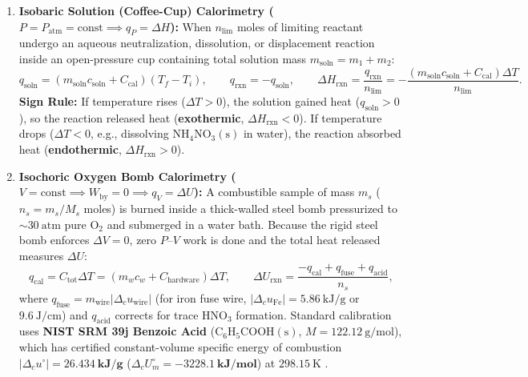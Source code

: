 \begin{enumerate}
  \item \textbf{Isobaric Solution (Coffee-Cup) Calorimetry ($P = P_{\mathrm{atm}} = \text{const} \implies q_P = \Delta H$):}
  When $n_{\mathrm{lim}}$ moles of limiting reactant undergo an aqueous neutralization, dissolution, or displacement reaction inside an open-pressure cup containing total solution mass $m_{\mathrm{soln}} = m_1 + m_2$:
  \begin{equation}\label{eq:04:coffeecup}
    q_{\mathrm{soln}} = (m_{\mathrm{soln}} c_{\mathrm{soln}} + C_{\mathrm{cal}})(T_f - T_i), \qquad
    q_{\mathrm{rxn}} = -q_{\mathrm{soln}}, \qquad
    \Delta H_{\mathrm{rxn}} = \frac{q_{\mathrm{rxn}}}{n_{\mathrm{lim}}} = -\frac{(m_{\mathrm{soln}} c_{\mathrm{soln}} + C_{\mathrm{cal}})\Delta T}{n_{\mathrm{lim}}}.
  \end{equation}
  \textbf{Sign Rule:} If temperature rises ($\Delta T > 0$), the solution gained heat ($q_{\mathrm{soln}} > 0$), so the reaction released heat (\textbf{exothermic}, $\Delta H_{\mathrm{rxn}} < 0$). If temperature drops ($\Delta T < 0$, e.g., dissolving $\mathrm{NH_4NO_3(s)}$ in water), the reaction absorbed heat (\textbf{endothermic}, $\Delta H_{\mathrm{rxn}} > 0$).
  \item \textbf{Isochoric Oxygen Bomb Calorimetry ($V = \text{const} \implies W_{\mathrm{by}} = 0 \implies q_V = \Delta U$):}
  A combustible sample of mass $m_s$ ($n_s = m_s/M_s$ moles) is burned inside a thick-walled steel bomb pressurized to $\sim\SI{30}{\text{atm}}$ pure $\mathrm{O_2}$ and submerged in a water bath. Because the rigid steel bomb enforces $\Delta V = 0$, zero $P\text{--}V$ work is done and the total heat released measures $\Delta U$:
  \begin{equation}\label{eq:04:bomb}
    q_{\mathrm{cal}} = C_{\mathrm{tot}}\Delta T = (m_w c_w + C_{\mathrm{hardware}})\Delta T, \qquad
    \Delta U_{\mathrm{rxn}} = \frac{-q_{\mathrm{cal}} + q_{\mathrm{fuse}} + q_{\mathrm{acid}}}{n_s},
  \end{equation}
  where $q_{\mathrm{fuse}} = m_{\mathrm{wire}}|\Delta_c u_{\mathrm{wire}}|$ (for iron fuse wire, $|\Delta_c u_{\mathrm{Fe}}| = \SI{5.86}{\kilo\joule\per\gram}$ or $\SI{9.6}{\joule\per\centi\meter}$) and $q_{\mathrm{acid}}$ corrects for trace $\mathrm{HNO_3}$ formation. Standard calibration uses \textbf{NIST SRM 39j Benzoic Acid} ($\mathrm{C_6H_5COOH(s)}$, $M = \SI{122.12}{\gram\per\mole}$), which has certified constant-volume specific energy of combustion $|\Delta_c u^\circ| = \mathbf{\SI{26.434}{\kilo\joule\per\gram}}$ ($\Delta_c U_m^\circ = \mathbf{-\SI{3228.1}{\kilo\joule\per\mole}}$) at $\SI{298.15}{\kelvin}$ .

\end{enumerate}
